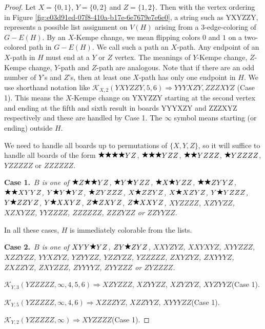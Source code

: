 \documentclass[12pt]{article}
\theoremstyle{plain}
\theoremstyle{definition}
\theoremstyle{remark}
\newcommand{\fancy}[1]{\mathcal{#1}}
\def\K{\fancy{K}}
\newcommand{\case}[2]{{\bf Case #1.}~{\it #2}~~}
\newcommand{\wild}{\raisebox{0.75\depth}{$\bigstar$}}
\begin{document}
\begin{proof}Let $X = \{0,1\}$, $Y = \{0,2\}$ and $Z = \{1,2\}$. Then with the vertex ordering in Figure \ref{fig:e03d91ed-07f8-410a-b17e-6e7679e7e6e0}, a string such as YXYZZY, 
	represents a possible list assignment on $V(H)$ arising from a $3$-edge-coloring of $G-E(H)$.
	By an $X$-Kempe change, we mean flipping colors $0$ and $1$ on a two-colored path in $G-E(H)$.  We call such a path an $X$-path. 
	Any endpoint of an $X$-path in $H$ must end at a $Y$ or $Z$ vertex.  The meanings of $Y$-Kempe change, $Z$-Kempe change, $Y$-path and $Z$-path are analogous.
	Note that if there are an odd number of $Y$'s and $Z$'s, then at least one $X$-path has only one endpoint in $H$.
	We use shorthand notation like $\K_{X, 2}(YXYZZY,5,6) \Rightarrow YYYXZY,ZZZXYZ$ (Case 1).
	This means the $X$-Kempe change on YXYZZY starting at the second vertex and ending at the fifth and sixth result in boards YYYXZY and ZZZXYZ respectively and these are handled by Case 1.
	The $\infty$ symbol means starting (or ending) outside $H$.
	
	We need to handle all boards up to permutations of $\{X,Y,Z\}$, so it will suffice to handle all boards of the form $\wild \wild \wild \wild YZ$, $\wild \wild \wild YZZ$, $\wild \wild YZZZ$, $\wild YZZZZ$, $YZZZZZ$ or $ZZZZZZ$.
	
	
	\bigskip
	\case{1}{$B$ is one of $\wild Z\wild \wild YZ$, $\wild Y\wild YZZ$, $\wild X\wild YZZ$, $\wild \wild ZYYZ$, $\wild \wild XYYZ$, $Y\wild Y\wild YZ$, $\wild ZYZZZ$, $X\wild ZZYZ$, $X\wild XZYZ$, $Y\wild YZZZ$, $Y\wild ZZYZ$, $Y\wild XXYZ$, $Z\wild ZXYZ$, $Z\wild XXYZ$, $XYZZZZ$, $XZYYZZ$, $XZXYZZ$, $YYZZZZ$, $ZZZZZZ$, $ZZZYZZ$ or $ZZYYZZ$.}
	
	\bigskip
	
	In all these cases, $H$ is immediately colorable from the lists.
	
	
	\bigskip
	\case{2}{$B$ is one of $XYY\wild YZ$, $ZY\wild ZYZ$, $XXYZYZ$, $XXYXYZ$, $XYYZZZ$, $XZZYZZ$, $YYXZYZ$, $YZYYZZ$, $YZZYZZ$, $YZZZZZ$, $ZXYZYZ$, $ZXYYYZ$, $ZXZZYZ$, $ZXYZZZ$, $ZYYYYZ$, $ZYYZZZ$ or $ZYZZZZ$.}
	
	\bigskip
	
	$\K_{Y,3}(YZZZZZ,\infty,4, 5, 6)\Rightarrow $$XZYZZZ$, $XZYYZZ$, $XZYZYZ$, $XYZYYZ$(Case 1).
	
	$\K_{Y,5}(YZZZZZ,\infty,4, 6)\Rightarrow $$XZZZYZ$, $XZZYYZ$, $XYYYZZ$(Case 1).
	
	$\K_{Y,2}(YZZZZZ,\infty)\Rightarrow $$XYZZZZ$(Case 1).
	
	
	

\end{proof}
\end{document}
